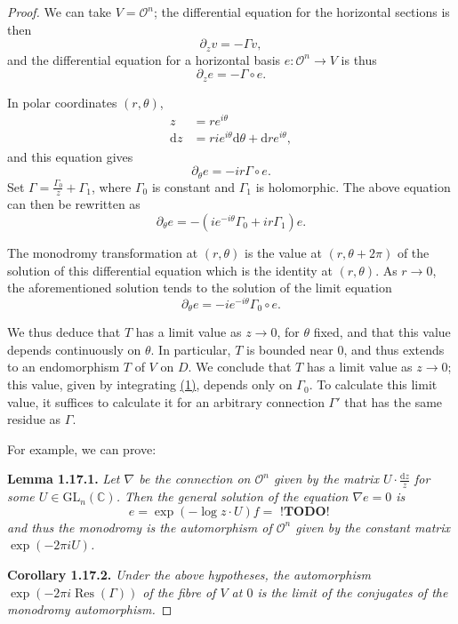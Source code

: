 \documentclass{report}
\newenvironment{itenv}[1]
  {\phantomsection\par\medskip\noindent\textbf{#1.}\itshape}
  {\medskip}
\renewcommand{\cal}[1]{{\mathcal{#1}}}
\newcommand{\CC}{\mathbb{C}}
\newcommand{\dd}{\mathrm{d}}
\newcommand{\GL}{\mathrm{GL}}
\DeclareMathOperator{\Res}{Res}
\newcommand{\todo}{\textbf{ !TODO! }}
\newcommand{\oldpage}[1]{\marginpar{\footnotesize$\Big\vert$ \textit{p.~#1}}}
\begin{document}
\begin{proof}
  We can take $V=\cal{O}^n$;
  the differential equation for the horizontal sections is then
  \[
    \partial_z v = -\Gamma v,
  \]
  and the differential equation for a horizontal basis $e\colon\cal{O}^n\to V$ is thus
  \[
  \label{II.1.17.proof.1}
    \partial_z e = -\Gamma\circ e.
  \tag{1}
  \]

  In polar coordinates $(r,\theta)$,
  \[
    \begin{aligned}
      z &= re^{i\theta}
    \\\dd z &= rie^{i\theta}\dd\theta+\dd re^{i\theta},
    \end{aligned}
  \]
  and this equation gives
\oldpage{54}
  \[
    \partial_\theta e = -ir\Gamma\circ e.
  \]
  Set $\Gamma=\frac{\Gamma_0}{z}+\Gamma_1$, where $\Gamma_0$ is constant and $\Gamma_1$ is holomorphic.
  The above equation can then be rewritten as
  \[
    \partial_\theta e = -(ie^{-i\theta}\Gamma_0+ir\Gamma_1)e.
  \]

  The monodromy transformation at $(r,\theta)$ is the value at $(r,\theta+2\pi)$ of the solution of this differential equation which is the identity at $(r,\theta)$.
  As $r\to0$, the aforementioned solution tends to the solution of the limit equation
  \[
  \label{II.1.17.proof.2}
    \partial_\theta e = -ie^{-i\theta}\Gamma_0\circ e.
  \tag{2}
  \]

  We thus deduce that $T$ has a limit value as $z\to0$, for $\theta$ fixed, and that this value depends continuously on $\theta$.
  In particular, $T$ is bounded near $0$, and thus extends to an endomorphism $T$ of $V$ on $D$.
  We conclude that $T$ has a limit value as $z\to0$;
  this value, given by integrating \hyperref[II.1.17.proof.1]{(1)}, depends only on $\Gamma_0$.
  To calculate this limit value, it suffices to calculate it for an arbitrary connection $\Gamma'$ that has the same residue as $\Gamma$.

  For example, we can prove:
  \begin{itenv}{Lemma 1.17.1}
  \label{II.1.17.1}
    Let $\nabla$ be the connection on $\cal{O}^n$ given by the matrix $U\cdot\frac{\dd z}{z}$ for some $U\in\GL_n(\CC)$.
    Then the general solution of the equation $\nabla e=0$ is
    \[
      e = \exp(-\log z\cdot U)f = \todo
    \]
    and thus the monodromy is the automorphism of $\cal{O}^n$ given by the constant matrix $\exp(-2\pi iU)$.
  \end{itenv}

  \begin{itenv}{Corollary 1.17.2}
  \label{II.1.17.2}
    Under the above hypotheses, the automorphism $\exp(-2\pi i\Res(\Gamma))$ of the fibre of $V$ at $0$ is the limit of the conjugates of the monodromy automorphism.
  \end{itenv}


\end{proof}
\end{document}
